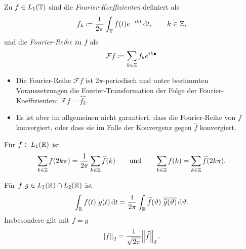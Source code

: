 \begin{definition}
Zu $ f \in L_{1}(\mathbb{T}) $ sind die \emph{Fourier-Koeffizienten} definiert als
\[
  f_{k} \coloneqq \frac{1}{2\pi} \int_{\T} f(t) e^{-ikt} \dif t, \qquad k \in \Z,
\]
und die \emph{Fourier-Reihe} zu $ f $ als
\[
    \mathcal{F}f \coloneqq \sum_{k \in \mathbb{Z}} f_{k} e^{ik\bullet}
\]
\end{definition}

\begin{remark}\leavevmode
\begin{itemize}
\item Die Fourier-Reihe $ \mathcal{F}f $ ist $ 2\pi $-periodisch und unter bestimmten
  Voraussetzungen die Fourier-Transformation der Folge der Fourier-Koeffizienten: 
  $ \mathcal{F}f = \widehat{f_{k}} $.
\item Es ist aber im allgemeinen nicht garantiert, dass die Fourier-Reihe von $ f $ konvergiert, 
  oder dass sie im Falle der Konvergenz gegen $ \widehat{f} $ konvergiert.
\end{itemize}
\end{remark}

\begin{proposition}
Für $ f \in L_{1}(\mathbb{R}) $ ist
\[
  \sum_{k \in \mathbb{Z}} f(2k\pi) = \frac{1}{2\pi} \sum_{k \in \mathbb{Z}} \widehat{f}(k)
  \qquad \text{und} \qquad
  \sum_{k \in \mathbb{Z}} f(k) = \sum_{k \in \mathbb{Z}} \widehat{f}(2k\pi).
\]
\end{proposition}

\begin{proposition}
Für $ f, g \in L_{1}(\mathbb{R}) \cap L_{2}(\mathbb{R}) $ ist
\[
    \int_{\R} f(t) \ g(t) \dif t 
  = \frac{1}{2\pi} \int_{\R} \widehat{f}(\vartheta) \ \overline{\widehat{g}(\vartheta)}
      \dif \vartheta.
\]
Insbesondere gilt mit $ f = g $
\[
  \norm{f}_{2} = \frac{1}{\sqrt{2\pi}} \norm{\widehat{f}}_{2}.
\]
\end{proposition}

